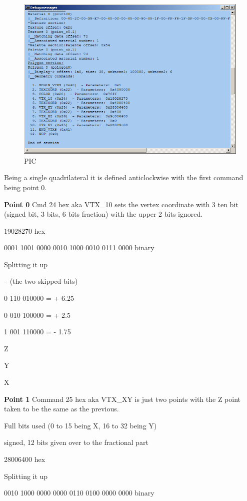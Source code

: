 \documentclass[
]{book}
\begin{document}
\begin{figure}
\centering
\includegraphics{images/63_home_fast6191_romhackingguide_unrenamed_file____romhackingguidegraphics3dminorNSMBDmodel_1.png}
\caption{PIC}
\end{figure}

Being a single quadrilateral it is defined anticlockwise with the first command being point 0.

\textbf{Point 0} Cmd 24 hex aka VTX\_10 sets the vertex coordinate with 3 ten bit (signed bit, 3 bits, 6 bits fraction) with the upper 2 bits ignored.

19028270 hex

0001 1001 0000 0010 1000 0010 0111 0000 binary

Splitting it up

-- (the two skipped bits)

0 110 010000 = + 6.25

0 010 100000 = + 2.5

1 001 110000 = - 1.75

Z

Y

X

\textbf{Point 1} Command 25 hex aka VTX\_XY is just two points with the Z point taken to be the same as the previous.

Full bits used (0 to 15 being X, 16 to 32 being Y)

signed, 12 bits given over to the fractional part

28006400 hex

Splitting it up

0010 1000 0000 0000 0110 0100 0000 0000 binary
\end{document}
